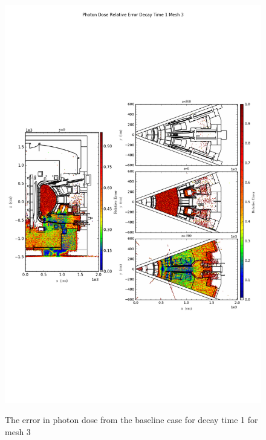 \begin{figure}[ht!]
\centering
\includegraphics[trim={0cm 9cm 0cm 10cm},clip,scale=0.75]{../plots/final_model_nob4c/Photon_Dose_Relative_Error_Decay_Time_1_Mesh_3.png}
\label{fig:photons_dc1_no4bc_m3_error}
\caption{The error in photon dose from the baseline case for decay time 1 for mesh 3}
\end{figure}
